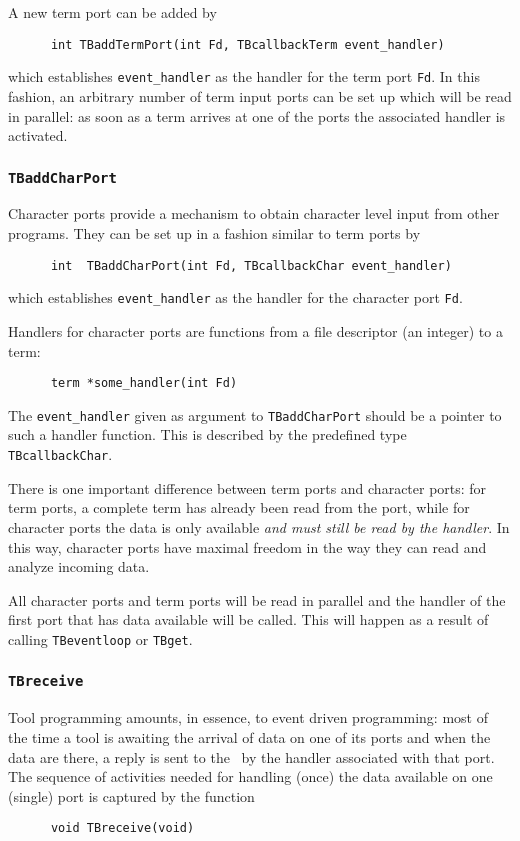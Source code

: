 \documentclass[a4,twoside,noweb]{article} %
\begin{document}
A new term port can be added by
\begin{verbatim}
      int TBaddTermPort(int Fd, TBcallbackTerm event_handler)
\end{verbatim}
which establishes {\tt event\_handler} as the handler for the term port {\tt Fd}.
In this fashion, an arbitrary number of term input ports can be set up which
will be read in parallel: as soon as a term arrives at one of the ports
the associated handler is activated.

\subsubsection{\label{TBaddCharPort}{\tt TBaddCharPort}}

Character ports provide a mechanism to obtain character level input
from other programs. They can be set up in a fashion similar 
to term ports by
\begin{verbatim}
      int  TBaddCharPort(int Fd, TBcallbackChar event_handler)
\end{verbatim}
which establishes {\tt event\_handler} as the handler for the character port {\tt Fd}.

Handlers for character ports are functions from a file descriptor (an integer)
to a term:
\begin{verbatim}
      term *some_handler(int Fd)
\end{verbatim}
The {\tt event\_handler} given as argument to
{\tt TBaddCharPort} should be a pointer to such a handler function.
This is described by the predefined type {\tt TBcallbackChar}.

There is one important difference between term ports and character ports:
for term ports, a complete term has already been read from the port,
while for character ports the data is only available {\em and must still
be read by the handler}. In this way, character ports have maximal
freedom in the way they can read and analyze incoming data.

All character ports and term ports will be read in parallel
and the handler of the first port that has data available will be called.
This will happen as a result of calling {\tt TBeventloop} or {\tt TBget}.

\subsubsection{\label{TBreceive}{\tt TBreceive}}

Tool programming amounts, in essence, to event driven programming: most of the time
a tool is awaiting the arrival of data on one of its
ports and when the data are there, a reply is sent to the \TB\ by the
handler associated with that port.  The sequence of activities needed for
handling (once) the data available on one (single) port is captured by the function
\begin{verbatim}
      void TBreceive(void)
\end{verbatim}
\end{document}
